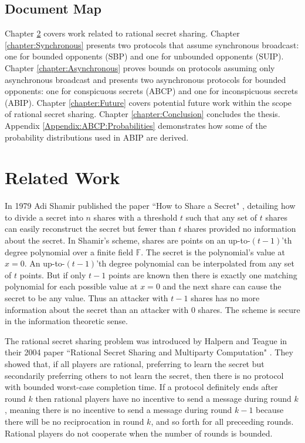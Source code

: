 \documentclass{dalcsthesis}
\begin{document}
\section{Document Map}

Chapter \ref{chapter:RelatedWork} covers work related to rational secret sharing. Chapter \ref{chapter:Synchronous} presents two protocols that assume synchronous broadcast: one for bounded opponents (SBP) and one for unbounded opponents (SUIP). Chapter \ref{chapter:Asynchronous} proves bounds on protocols assuming only asynchronous broadcast and presents two asynchronous protocols for bounded opponents: one for conspicuous secrets (ABCP) and one for inconspicuous secrets (ABIP). Chapter \ref{chapter:Future} covers potential future work within the scope of rational secret sharing. Chapter \ref{chapter:Conclusion} concludes the thesis. Appendix \ref{Appendix:ABCP:Probabilities} demonstrates how some of the probability distributions used in ABIP are derived.




\chapter{Related Work}
\label{chapter:RelatedWork}

In 1979 Adi Shamir published the paper ``How to Share a Secret" \cite{shamir79}, detailing how to divide a secret into $n$ shares with a threshold $t$ such that any set of $t$ shares can easily reconstruct the secret but fewer than $t$ shares provided no information about the secret. In Shamir's scheme, shares are points on an up-to-$(t-1)$'th degree polynomial over a finite field $\mathbb{F}$. The secret is the polynomial's value at $x=0$. An up-to-$(t-1)$'th degree polynomial can be interpolated from any set of $t$ points. But if only $t-1$ points are known then there is exactly one matching polynomial for each possible value at $x=0$ and the next share can cause the secret to be any value. Thus an attacker with $t-1$ shares has no more information about the secret than an attacker with $0$ shares. The scheme is secure in the information theoretic sense.

The rational secret sharing problem was introduced by Halpern and Teague in their 2004 paper ``Rational Secret Sharing and Multiparty Computation" \cite{halpern04}. They showed that, if all players are rational, preferring to learn the secret but secondarily preferring others to not learn the secret, then there is no protocol with bounded worst-case completion time. If a protocol definitely ends after round $k$ then rational players have no incentive to send a message during round $k$, meaning there is no incentive to send a message during round $k-1$ because there will be no reciprocation in round $k$, and so forth for all preceeding rounds. Rational players do not cooperate when the number of rounds is bounded.
\end{document}
